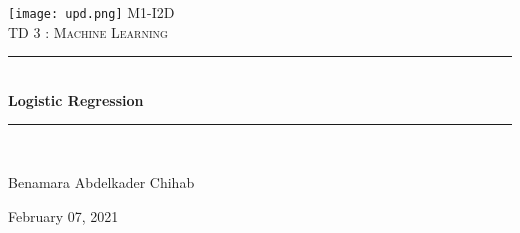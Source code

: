 \documentclass[12pt]{article}
\begin{document}
 

\begin{titlepage}
\lhead{\textcolor{primaryColor}{ML M1-IDD - 2020/2021}}

\newcommand{\HRule}{\rule{\linewidth}{0.5mm}} 

\center
 


\texttt{[image: upd.png]}
\center\textsc{\large M1-I2D}\\[0.5cm]
\vspace{2cm}
\textsc{\Large \textcolor{primaryColor}{TD 3 :} Machine Learning}\\[1.5cm] 



\HRule \\[0.4cm]
{ \huge \bfseries Logistic Regression}\\[0.4cm] 
\HRule \\[1.5cm]
 

\begin{minipage}{0.4\textwidth}
\begin{flushleft} \large
Benamara Abdelkader Chihab 
\end{flushleft}
\end{minipage}
\vspace{2cm}



{\large February 07, 2021}\\[2cm]



\vfill 

\end{titlepage}
\end{document}

